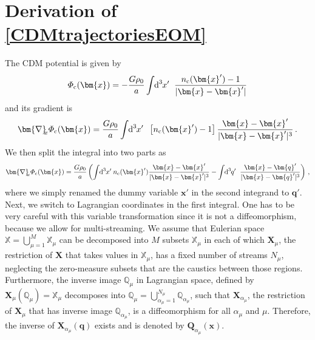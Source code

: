 \documentclass[twocolumn, nofootinbib, showpacs, superscriptaddress]{revtex4-1}
\newcommand{\sigu}{{\sigma_{\! u}}}
\newcommand{\sigx}{{\sigma_{\! x}}}
\renewcommand{\d}[0]{{\rm{d}}}
\renewcommand{\c}[0]{{\rm{c}}}
\newcommand{\vol}[2]{\hspace{-0.8mm}\mbox{$\text{d}^{\hspace{-0.0mm}#1}$}\hspace{-0.2mm}#2\hspace{0.8mm}\ }
\newcommand{\vx}[0]{\bm{x} }
\newcommand{\vX}[0]{\bm{X} }
\newcommand{\vq}[0]{\bm{q} }
\newcommand{\vQ}[0]{\bm{Q} }
\newcommand{\vnabla}[0]{\bm{\nabla} }
\begin{document}
 

\section{Derivation of \eqref{CDMtrajectoriesEOM}}
\label{sec:DerivationofCDMtrajectories}
The CDM potential is given by
\begin{equation}
\varPhi_\c(\vx) = - \frac{ G \rho_0}{a} \int \vol{3}{x'} \frac{n_\c(\vx') -1}{|\vx -\vx'|}
\end{equation}
and its gradient is
\begin{equation}
\vnabla_{\!\!x} \varPhi_\c(\vx) = \frac{ G \rho_0}{a} \int \vol{3}{x'} \left[n_\c(\vx') -1\right] \frac{\vx -\vx'}{|\vx -\vx'|^3}\,.
\end{equation}
We then split the integral into two parts as
\begin{equation} \label{acceleration1}
\vnabla_{\!\!x} \varPhi_\c(\vx) = \frac{ G \rho_0}{a} \left( \int \vol{3}{x'} \!\!n_\c(\vx')  \frac{\vx -\vx'}{|\vx -\vx'|^3} -\int \vol{3}{q'} \frac{\vx -\vq'}{|\vx -\vq'|^3} \right)\,,
\end{equation}
where we simply renamed the dummy variable $\vx'$ in the second integrand to $\vq'$.
Next, we switch to Lagrangian coordinates in the first integral. One has to be very careful with this 
variable transformation since it is not a diffeomorphism, because we allow for multi-streaming. 
We assume that Eulerian space $\mathbb{X}= \bigcup_{\mu=1}^{M} \mathbb{X}_\mu$ can be decomposed into $M$ subsets $\mathbb{X}_\mu$ in each of which $\vX_\mu$, the restriction of $\vX$ that takes values in $\mathbb{X}_\mu$, has a fixed number of streams $N_\mu$, neglecting the zero-measure subsets that are the caustics between those regions. Furthermore, the inverse image $\mathbb{Q}_\mu$ in Lagrangian space, defined by $\vX_\mu(\mathbb{Q}_\mu) = \mathbb{X}_\mu$  decomposes into $\mathbb{Q}_\mu =\bigcup_{\alpha_\mu=1}^{N_\mu}   \mathbb{Q}_{\alpha_\mu}$, such that  $\vX_{\alpha_\mu}$, the restriction of $\vX_\mu$ that has inverse image $\mathbb{Q}_{\alpha_\mu}$, is a diffeomorphism for all $\alpha_\mu$ and $\mu$. Therefore, the inverse of $\vX_{\alpha_\mu}(\vq)$ exists and is denoted by $\vQ_{\alpha_\mu}(\vx)$.
\end{document}
